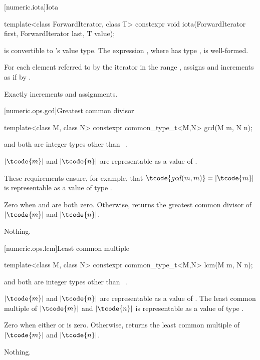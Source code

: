 [numeric.iota]{Iota}

%
\begin{itemdecl}
template<class ForwardIterator, class T>
  constexpr void iota(ForwardIterator first, ForwardIterator last, T value);
\end{itemdecl}

\begin{itemdescr}
\pnum
\mandates
{} is convertible to 's value type.
The expression , where  has type ,
is well-formed.

\pnum
\effects
For each element referred to by the iterator 
in the range ,
assigns  and increments 
as if by .

\pnum
\complexity
Exactly  increments and assignments.
\end{itemdescr}

[numeric.ops.gcd]{Greatest common divisor}

%
\begin{itemdecl}
template<class M, class N>
  constexpr common_type_t<M,N> gcd(M m, N n);
\end{itemdecl}

\begin{itemdescr}
\pnum
\mandates
{} and  both are integer types other than
\cv{}~.

\pnum
\expects
$|\tcode{m}|$ and $|\tcode{n}|$
are representable as a value of .
\begin{note}
These requirements ensure, for example,
that $\tcode{gcd(m, m)} = |\tcode{m}|$
is representable as a value of type .
\end{note}


\pnum
\returns
Zero when  and  are both zero. Otherwise,
returns the greatest common divisor of $|\tcode{m}|$ and $|\tcode{n}|$.

\pnum
\throws
Nothing.
\end{itemdescr}

[numeric.ops.lcm]{Least common multiple}

%
\begin{itemdecl}
template<class M, class N>
  constexpr common_type_t<M,N> lcm(M m, N n);
\end{itemdecl}

\begin{itemdescr}
\pnum
\mandates
{} and  both are integer types other than
\cv{}~.

\pnum
\expects
$|\tcode{m}|$ and $|\tcode{n}|$
are representable as a value of .
The least common multiple of $|\tcode{m}|$ and $|\tcode{n}|$
is representable as a value of type .


\pnum
\returns
Zero when either  or  is zero.
Otherwise, returns the least common multiple of $|\tcode{m}|$ and $|\tcode{n}|$.

\pnum
\throws
Nothing.
\end{itemdescr}

